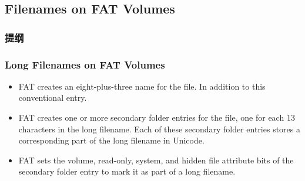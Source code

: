 % 
% 
\subsection{Filenames on FAT Volumes} %
\begin{frame}
\frametitle{提纲} %
\tableofcontents %

\end{frame}
\begin{frame}[fragile]
    \frametitle{Long Filenames on FAT Volumes}
    \begin{itemize}
        \item FAT creates an {\color{red}eight-plus-three name} for the file. In addition to this conventional entry.  \pause
        \item FAT creates {\color{red}one or more secondary folder entries} for the file, one for each 13 characters in the {\color{red}long filename}. Each of these secondary folder entries stores a corresponding part of the long filename in Unicode. \pause
        \item FAT sets the volume, read-only, system, and hidden {\color{red}file attribute bits} of the secondary folder entry to mark it as part of a long filename. 
    \end{itemize}
\end{frame}
